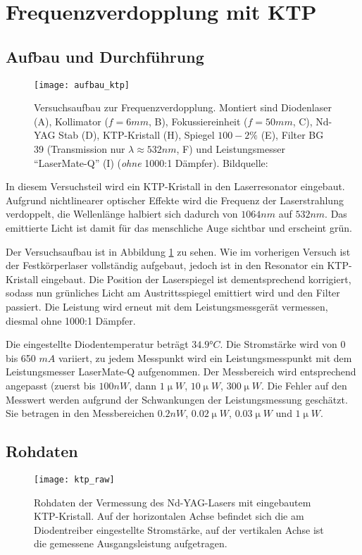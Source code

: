 \documentclass{../Misc/MontavonLaTeX/Montavon}
\newcommand{\halfwidth}{0.48\textwidth}
\newcommand{\fullwidth}{1.0\textwidth}
\begin{document}
\section{Frequenzverdopplung mit KTP}
\subsection{Aufbau und Durchführung}
\begin{figure}[htbp]
\centering
\texttt{[image: aufbau\_ktp]}
\caption{Versuchsaufbau zur Frequenzverdopplung. Montiert sind Diodenlaser (A), Kollimator ($f = 6 \unit{mm}$, B), Fokussiereinheit ($f = 50 \unit{mm}$, C), Nd-YAG Stab (D), KTP-Kristall (H), Spiegel $100-2 \unit{\%}$ (E), Filter BG 39 (Transmission nur $\lambda \approx 532 \unit{nm}$, F) und Leistungsmesser \enquote{LaserMate-Q} (I) (\emph{ohne} 1000:1 Dämpfer). Bildquelle: \cite[S. 38]{anleitung1}}
\label{fig:aufbau_ktp}
\end{figure}

In diesem Versuchsteil wird ein KTP-Kristall in den Laserresonator eingebaut. Aufgrund nichtlinearer optischer Effekte wird die Frequenz der Laserstrahlung verdoppelt, die Wellenlänge halbiert sich dadurch von $1064 \unit{nm}$ auf $532 \unit{nm}$. Das emittierte Licht ist damit für das menschliche Auge sichtbar und erscheint grün.

Der Versuchsaufbau ist in Abbildung \ref{fig:aufbau_ktp} zu sehen. Wie im vorherigen Versuch ist der Festkörperlaser vollständig aufgebaut, jedoch ist in den Resonator ein KTP-Kristall eingebaut. Die Position der Laserspiegel ist dementsprechend korrigiert, sodass nun grünliches Licht am Austrittsspiegel emittiert wird und den Filter passiert. Die Leistung wird erneut mit dem Leistungsmessgerät vermessen, diesmal ohne 1000:1 Dämpfer. 

Die eingestellte Diodentemperatur beträgt $34.9 \unit{\degree C}$. Die Stromstärke wird von 0 bis 650 $\unit{mA}$ variiert, zu jedem Messpunkt wird ein Leistungsmesspunkt mit dem Leistungsmesser LaserMate-Q aufgenommen. Der Messbereich wird entsprechend angepasst (zuerst bis $100 \unit{nW}$, dann $1 \unit{\upmu W}$, $10 \unit{\upmu W}$, $300 \unit{\upmu W}$.
Die Fehler auf den Messwert werden aufgrund der Schwankungen der Leistungsmessung geschätzt. Sie betragen in den Messbereichen $0.2 \unit{nW}$, $0.02 \unit{\upmu W}$, $0.03 \unit{\upmu W}$ und $1 \unit{\upmu W}$.

\subsection{Rohdaten}
\begin{figure}[htbp]
\centering
\texttt{[image: ktp\_raw]}
\caption{Rohdaten der Vermessung des Nd-YAG-Lasers mit eingebautem KTP-Kristall. Auf der horizontalen Achse befindet sich die am Diodentreiber eingestellte Stromstärke, auf der vertikalen Achse ist die gemessene Ausgangsleistung aufgetragen.}
\label{fig:ktp_raw}
\end{figure}
\end{document}
